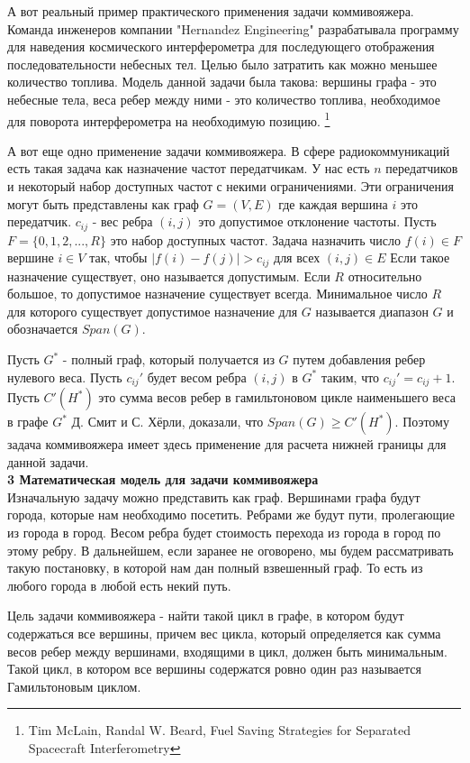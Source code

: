 \documentclass[a4paper, 14pt]{extarticle}
\begin{document}
А вот реальный пример практического применения задачи коммивояжера. Команда инженеров компании "Hernandez Engineering"  разрабатывала программу для наведения космического интерферометра для последующего отображения последовательности небесных тел. Целью было затратить как можно меньшее количество топлива. Модель данной задачи была такова: вершины графа - это небесные тела, веса ребер между ними - это количество топлива, необходимое для поворота интерферометра на необходимую позицию. \footnote{Tim McLain, Randal W. Beard, Fuel Saving Strategies for Separated Spacecraft Interferometry}

А вот еще одно применение задачи коммивояжера. В сфере радиокоммуникаций есть такая задача как назначение частот передатчикам. У нас есть $n$ передатчиков и некоторый набор доступных частот с некими ограничениями. Эти ограничения могут быть представлены как граф $G= (V, E)$ где каждая вершина $i$ это передатчик. $c_{ij}$ - вес ребра $(i,j)$ это допустимое отклонение частоты. Пусть $F = \{ 0,1,2,...,R \}$ это набор доступных частот. Задача назначить число $f(i) \in F$ вершине $i \in V$ так, чтобы $|f(i)-f(j)| > c_{ij}$ для всех $(i,j) \in E$ Если такое назначение существует, оно называется допустимым. Если $R$ относительно большое, то допустимое назначение существует всегда. Минимальное число $R$ для которого существует допустимое назначение для $G$ называется диапазон $G$ и обозначается $Span(G)$.

Пусть $G^*$ - полный граф, который получается из $G$ путем добавления ребер нулевого веса. Пусть $c_{ij}'$ будет весом ребра $(i,j)$ в $G^*$ таким, что $c_{ij}' = c_{ij}+1$. Пусть $C'(H^*)$ это сумма весов ребер в гамильтоновом цикле наименьшего веса в графе $G^*$ Д. Смит и С. Хёрли, доказали, что $Span(G) \geq C'(H^*)$. Поэтому задача коммивояжера имеет здесь применение для расчета нижней границы для данной задачи. \\

\textbf{3 Математическая модель для задачи коммивояжера}  \\

Изначальную задачу можно представить как граф. Вершинами графа будут города, которые нам необходимо посетить. Ребрами же будут пути, пролегающие из города в город. Весом ребра будет стоимость перехода из города в город по этому ребру. В дальнейшем, если заранее не оговорено, мы будем рассматривать такую постановку, в которой нам дан полный взвешенный граф. То есть из любого города в любой есть некий путь.

Цель задачи коммивояжера - найти такой цикл в графе, в котором будут содержаться все вершины, причем вес цикла, который определяется как сумма весов ребер между вершинами, входящими в цикл, должен быть минимальным. Такой цикл, в котором все вершины содержатся ровно один раз называется Гамильтоновым циклом.
\end{document}
